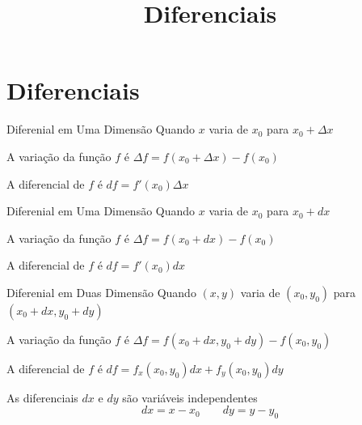 
\usepackage{calculo_varias_variaveis-1}

\title {Diferenciais}



\addtitle

\section{Diferenciais}

\begin{frame}{Diferenial em Uma Dimensão}
  Quando $x$ varia de $x_0$ para
  \tabto{55mm}\(x_0+\Delta x\)

  \pause
  \vspace{\baselineskip}
  A variação da função $f$ é
  \tabto{55mm}\(\Delta f = f(x_0 + \Delta x) - f(x_0)\)

  \pause
  \vspace{\baselineskip}
  A diferencial de $f$ é
  \tabto{55mm}\(df = f'(x_0) \Delta x\)
\end{frame}

\begin{frame}{Diferenial em Uma Dimensão}
  Quando $x$ varia de $x_0$ para
  \tabto{55mm}\(x_0+dx\)

  \vspace{\baselineskip}
  A variação da função $f$ é
  \tabto{55mm}\(\Delta f = f(x_0 + dx) - f(x_0)\)

  \vspace{\baselineskip}
  A diferencial de $f$ é
  \tabto{55mm}\(df = f'(x_0) dx\)
\end{frame}

\begin{frame}{Diferenial em Duas Dimensão}
  Quando $(x, y)$ varia de $(x_0, y_0)$ para
  \tabto{65mm}\((x_0+dx, y_0+dy)\)

  \pause
  \vspace{\baselineskip}
  A variação da função $f$ é
  \tabto{65mm}\(\Delta f = f(x_0+dx, y_0+dy) - f(x_0, y_0)\)

  \pause
  \vspace{\baselineskip}
  A diferencial de $f$ é
  \tabto{65mm}\(df = f_x(x_0, y_0) dx +  f_y(x_0, y_0) dy\)

  \pause
  \vspace{\baselineskip}
  As diferenciais $dx$ e $dy$ são variáveis independentes
  \[
    dx = x - x_0
    \qquad
    dy=y-y_0
  \]
\end{frame}

